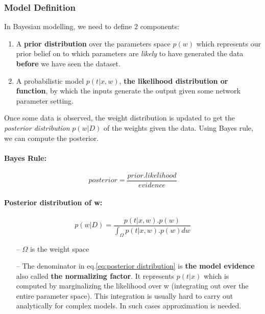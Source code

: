 \documentclass[main]{subfiles}
\begin{document}
\subsubsection{Model Definition}
In Bayesian modelling, we need to define 2 components:
        \begin{enumerate}
            \item A \textbf{prior distribution} over the parameters space \textbf{$p(w)$} which represents our prior belief on to which parameters are \textit{likely} to have generated the data \textbf{before} we have seen the dataset. 
            
            \item A probabilistic model \textbf{$p(t|x,w)$}, \textbf{the likelihood distribution or function}, by which the inputs generate the output given some network parameter setting.
        \end{enumerate}
        
Once some data is observed, the weight distribution is updated to get the \textit{posterior distribution} $p(w|D)$ of the weights given the data. Using Bayes rule, we can compute the posterior. 

\paragraph{Bayes Rule:}
    \begin{equation}
    \boxed{
        posterior = \frac{prior . likelihood}{evidence }
        }
    \end{equation}

\paragraph{Posterior distribution of w:}
\begin{equation}
    \boxed{
    p(w|D) = \frac{p(t|x,w). p(w)}{\int_\Omega p(t|x,w). p(w) dw}
    }
    \label{eq:posterior distribution}
\end{equation}

\begin{itemize}
    \item[--] $\Omega$ is the weight space 
    \item[--] The denominator in eq.\ref{eq:posterior distribution} is \textbf{the model evidence} also called \textbf{the normalizing factor}. It represents $p(t|x)$ which is computed by marginalizing the likelihood over w (integrating out over the entire parameter space). This integration is usually hard to carry out analytically for complex models. In such cases approximation is needed.
\end{itemize}
\end{document}
